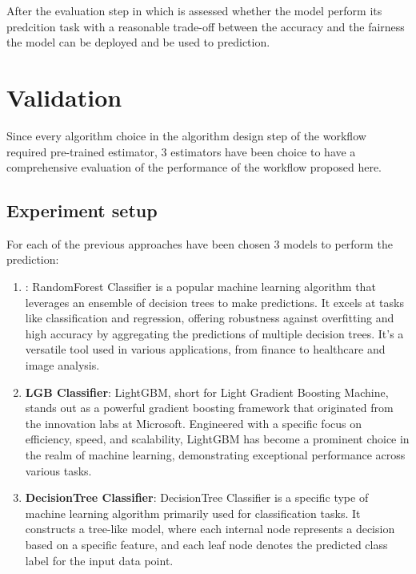 \documentclass[12pt,a4paper,openright,twoside]{book}
\begin{document}
After the evaluation step in which is assessed whether the model perform its predcition task with a reasonable trade-off between the accuracy and the fairness the model can be deployed and be used to prediction.

\chapter{Validation} %
\label{chap:validation}

Since every algorithm choice in the algorithm design step of the workflow required pre-trained estimator, 3 estimators have been choice to have a comprehensive evaluation of the performance of the workflow proposed here.

\section{Experiment setup}

For each of the previous approaches have been chosen 3 models to perform the prediction:

\begin{enumerate}

    \item {}: RandomForest Classifier is a popular machine learning algorithm that leverages an ensemble of decision trees to make predictions. It excels at tasks like classification and regression, offering robustness against overfitting and high accuracy by aggregating the predictions of multiple decision trees. It's a versatile tool used in various applications, from finance to healthcare and image analysis.
    
    \item \textbf{LGB Classifier}: LightGBM, short for Light Gradient Boosting Machine, stands out as a powerful gradient boosting framework that originated from the innovation labs at Microsoft. Engineered with a specific focus on efficiency, speed, and scalability, LightGBM has become a prominent choice in the realm of machine learning, demonstrating exceptional performance across various tasks.
    
    \item \textbf{DecisionTree Classifier}: DecisionTree Classifier is a specific type of machine learning algorithm primarily used for classification tasks. It constructs a tree-like model, where each internal node represents a decision based on a specific feature, and each leaf node denotes the predicted class label for the input data point.

\end{enumerate}
\end{document}
